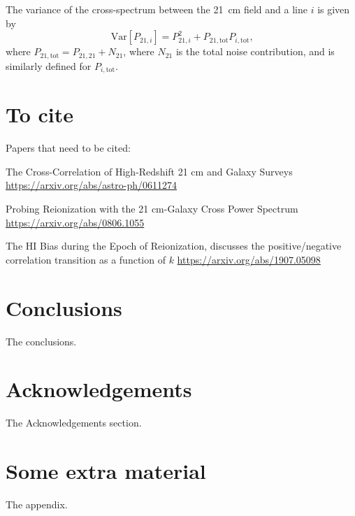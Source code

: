 \documentclass[a4paper,fleqn,usenatbib]{mnras}
\newcommand{\beq}{\begin{equation}}
\newcommand{\eeq}{\end{equation}}
\begin{document}
The variance of the cross-spectrum between the 21~cm field and a line $i$ is given by \citep[e.g.][]{2007ApJ...660.1030F}
\beq \label{eq:var_xps}
\text{Var}\left[P_{21,i}\right] = P_{21,i}^2 + P_{21,\text{tot}} P_{i,\text{tot}}\text{,}
\eeq
where $P_{21,\text{tot}} = P_{21,21} + N_{21}$, where $N_{21}$ is the total
noise contribution, and is similarly defined for $P_{i,\text{tot}}$.

\section{To cite}
Papers that need to be cited:

The Cross-Correlation of High-Redshift 21 cm and Galaxy Surveys
\url{https://arxiv.org/abs/astro-ph/0611274}

Probing Reionization with the 21 cm-Galaxy Cross Power Spectrum
\url{https://arxiv.org/abs/0806.1055}

The HI Bias during the Epoch of Reionization, discusses the positive/negative
correlation transition as a function of $k$
\url{https://arxiv.org/abs/1907.05098}

\section{Conclusions} \label{sec:conclusions}

The conclusions.

\section*{Acknowledgements}

The Acknowledgements section.






\appendix

\section{Some extra material}

The appendix.



\bsp	%
\label{lastpage}
\end{document}
